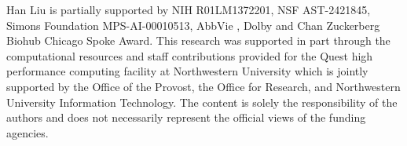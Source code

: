 Han Liu is partially supported by NIH R01LM1372201, NSF
AST-2421845, Simons Foundation
MPS-AI-00010513, AbbVie , Dolby and Chan Zuckerberg Biohub Chicago Spoke Award.
This research was supported in part through the computational resources and staff contributions provided for the Quest high performance computing facility at Northwestern University which is jointly supported by the Office of the Provost, the Office for Research, and Northwestern University Information Technology.
The content is solely the responsibility of the authors and does not necessarily represent the official
views of the funding agencies.





